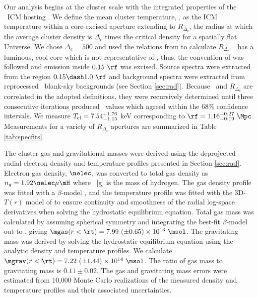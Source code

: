 \documentclass[useAMS,usenatbib]{mn2e}
\begin{document}
Our analysis begins at the cluster scale with the integrated
properties of the \rxj\ ICM hosting \irs. We define the mean cluster
temperature, \cltx, as the ICM temperature within a core-excised
aperture extending to $R_{\Delta_c}$, the radius at which the average
cluster density is $\Delta_c$ times the critical density for a
spatially flat Universe. We chose $\Delta_c = 500$ and used the
relations from \cite{2002A&A...389....1A} to calculate
$R_{\Delta_c}$. \irs\ has a luminous, cool core which is not
representative of \cltx, thus, the convention of
\citet{2007ApJ...668..772M} was followed and emission inside $0.15
~\rf$ was excised. Source spectra were extracted from the region $0.15
\dash 1.0~\rf$ and background spectra were extracted from reprocessed
\caldb\ blank-sky backgrounds (see Section \ref{sec:rad}). Because
\cltx\ and $R_{\Delta_c}$ are correlated in the adopted definitions,
they were recursively determined until three consecutive iterations
produced \cltx\ values which agreed within the 68\% confidence
intervals. We measure $T_{\mathrm{cl}} = 7.54^{+1.76}_{-1.15}$ keV corresponding
to $\rf = 1.16^{+0.27}_{-0.19}~\Mpc$. Measurements for a variety of
$R_{\Delta_c}$ apertures are summarized in Table \ref{tab:specfits}.

The cluster gas and gravitational masses were derived using the
deprojected radial electron density and temperature profiles presented
in Section \ref{sec:rad}. Electron gas density, $\nelec$, was
converted to total gas density as $n_g = 1.92 \nelec \mu \mH$ where
\mH\ [g] is the mass of hydrogen. The gas density profile was fitted
with a $\beta$-model \citep{betamodel}, and the temperature profile
was fitted with the 3D-$T(r)$ model of \citet{2006ApJ...640..691V} to
ensure continuity and smoothness of the radial log-space derivatives
when solving the hydrostatic equilibrium equation. Total gas mass was
calculated by assuming spherical symmetry and integrating the best-fit
$\beta$-model out to \rt, giving $\mgas(r<\rt) = 7.99 ~(\pm 0.65)
\times 10^{13} ~\msol$. The gravitating mass was derived by solving
the hydrostatic equilibrium equation using the analytic density and
temperature profiles. We calculate $\mgrav(r<\rt) = 7.22 ~(\pm 1.44)
\times 10^{14} ~\msol$. The ratio of gas mass to gravitating mass is
$0.11 \pm 0.02$. The gas and gravitating mass errors were estimated
from 10,000 Monte Carlo realizations of the measured density and
temperature profiles and their associated uncertainties.
\end{document}
